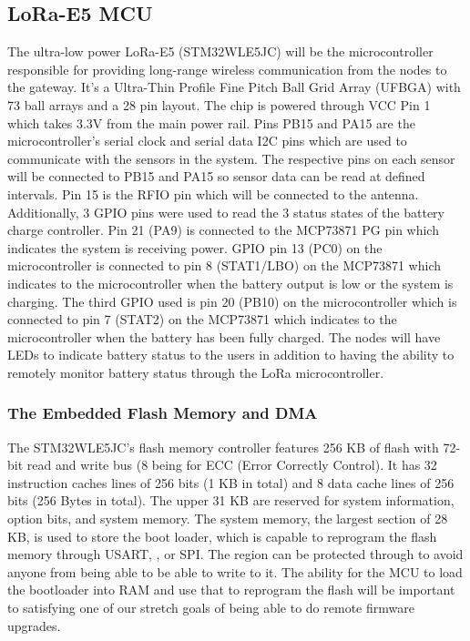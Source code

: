 \subsection{LoRa-E5 MCU}
The ultra-low power LoRa-E5 (STM32WLE5JC) will be the microcontroller responsible for providing long-range wireless communication from the nodes to the gateway. It's a Ultra-Thin Profile Fine Pitch Ball Grid Array (UFBGA) with 73 ball arrays and a 28 pin layout. The chip is powered through VCC Pin 1 which takes 3.3V from the main power rail. Pins PB15 and PA15 are the microcontroller's serial clock and serial data I2C pins which are used to communicate with the sensors in the system. The respective pins on each sensor will be connected to PB15 and PA15 so sensor data can be read at defined intervals. Pin 15 is the RFIO pin which will be connected to the antenna. Additionally, 3 GPIO pins were used to read the 3 status states of the battery charge controller. Pin 21 (PA9) is connected to the MCP73871 PG pin which indicates the system is receiving power. GPIO pin 13 (PC0) on the microcontroller is connected to pin 8 (STAT1/LBO) on the MCP73871 which indicates to the microcontroller when the battery output is low or the system is charging. The third GPIO used is pin 20 (PB10) on the microcontroller which is connected to pin 7 (STAT2) on the MCP73871 which indicates to the microcontroller when the battery has been fully  charged. The nodes will have LEDs to indicate battery status to the users in addition to having the ability to remotely monitor battery status through the LoRa microcontroller. 

\subsubsection{The Embedded Flash Memory and DMA}
The STM32WLE5JC's flash memory controller features 256 KB of flash with 72-bit read and write bus (8
being for ECC (Error Correctly Control). It has 32 instruction caches lines of 256 bits (1 KB in total)
and 8 data cache lines of 256 bits (256 Bytes in total). The upper 31 KB are reserved for system
information, option bits, and system memory. The system memory, the largest section of 28 KB, is
used to store the boot loader, which is capable to reprogram the flash memory through USART, \iic,
or SPI. The region can be protected through to avoid anyone from being able to be able to write to
it. The ability for the MCU to load the bootloader into RAM and use that to reprogram the flash will
be important to satisfying one of our stretch goals of being able to do remote firmware upgrades.

